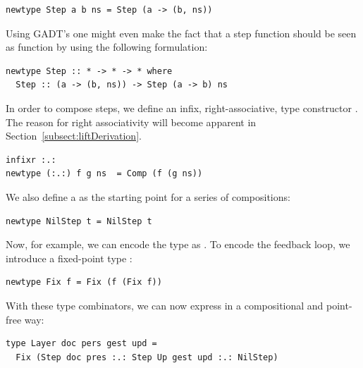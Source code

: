\documentclass[preprint,natbib]{sigplanconf}
\begin{document}
\begin{small}
\begin{verbatim}
newtype Step a b ns = Step (a -> (b, ns))
\end{verbatim}
\end{small}

\bc
Using GADT's one might even make the fact that a step function should be seen as function by using the following formulation:

\begin{small}
\begin{verbatim}
newtype Step :: * -> * -> * where
  Step :: (a -> (b, ns)) -> Step (a -> b) ns
\end{verbatim}
\end{small}
\ec

In order to compose steps, we define an infix, right-associative, type constructor .
The reason for right associativity will become apparent in Section~\ref{subsect:liftDerivation}.

\begin{small}
\begin{verbatim}
infixr :.:
newtype (:.:) f g ns  = Comp (f (g ns))
\end{verbatim}
\end{small}

We also define a  as the starting point for a series of compositions:

\begin{small}
\begin{verbatim}
newtype NilStep t = NilStep t
\end{verbatim}
\end{small}

Now, for example, we can encode the type  as
. To encode the feedback loop, we introduce a fixed-point type :

\begin{small}
\begin{verbatim}
newtype Fix f = Fix (f (Fix f))
\end{verbatim}
\end{small}

With these type combinators, we can now express  in a compositional and point-free way:

\begin{small}
\begin{verbatim}
type Layer doc pers gest upd = 
  Fix (Step doc pres :.: Step Up gest upd :.: NilStep)
\end{verbatim}
\end{small}
\end{document}
